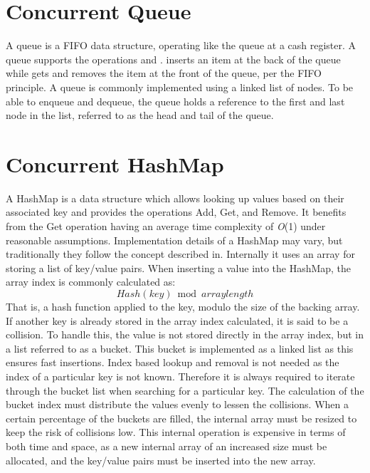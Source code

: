 \section{Concurrent Queue}\label{app:queue}
A queue is a \ac{FIFO} data structure, operating like the queue at a cash register\cite[p. 234]{cormen2009introduction}. A queue supports the operations  and .  inserts an item at the back of the queue while  gets and removes the item at the front of the queue, per the \ac{FIFO} principle. A queue is commonly implemented using a linked list of nodes\cite[p. 234]{cormen2009introduction}. To be able to enqueue and dequeue, the queue holds a reference to the first and last node in the list, referred to as the head and tail of the queue.
\section{Concurrent HashMap}\label{app:hashmap}
A HashMap is a data structure which allows looking up values based on their associated key and provides the operations Add, Get, and Remove. It benefits from the Get operation having an average time complexity of \textit{O}(1) under reasonable assumptions\cite[p. 256]{cormen2009introduction}. Implementation details of a HashMap may vary, but traditionally they follow the concept described in\cite[p. 256]{cormen2009introduction}. Internally it uses an array for storing a list of key/value pairs. When inserting a value into the HashMap, the  array index is commonly calculated as:
\begin{equation}
Hash(key) \bmod arraylength
\end{equation}
That is, a hash function applied to the key, modulo the size of the backing array. If another key is already stored in the array index calculated, it is said to be a collision. To handle this, the value is not stored directly in the array index, but in a list referred to as a bucket. This bucket is implemented as a linked list as this ensures fast insertions\cite[p. 257]{cormen2009introduction}. Index based lookup and removal is not needed as the index of a particular key is not known. Therefore it is always required to iterate through the bucket list when searching for a particular key. The calculation of the bucket index must distribute the values evenly to lessen the collisions. When a certain percentage of the buckets are filled, the internal array must be resized to keep the risk of collisions low. This internal operation is expensive in terms of both time and space, as a new internal array of an increased size must be allocated, and the key/value pairs must be inserted into the new array.

